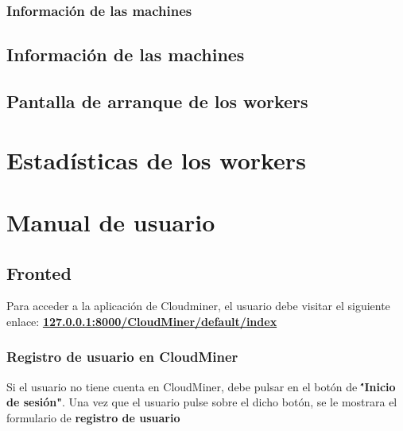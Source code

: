     \subsubsection{Informaci\'on de las machines}
    \subsection{Informaci\'on de las machines}
    \fboxsep 0.05cm
    
            \subsection{Pantalla de arranque de los workers}
            \fboxsep 0.05cm

    \section{Estad\'isticas de los workers}
    \fboxsep 0.05cm

\section{Manual de usuario}
    \subsection{Fronted}
    Para acceder a la aplicaci\'on de Cloudminer, el usuario debe visitar el siguiente enlace:
    \textbf{ \href{127.0.0.1:8000/CloudMiner/default/index}{127.0.0.1:8000/CloudMiner/default/index}}
    
     \fboxsep 0.05cm
        
        \subsubsection{Registro de usuario en CloudMiner}
        Si el usuario no tiene cuenta en CloudMiner, debe pulsar en el bot\'on de \textbf{\''Inicio de sesi\'on"}. Una vez que el usuario pulse sobre el dicho bot\'on, se le mostrara el formulario de  
        \textbf{registro de usuario}
        
        \fboxsep 0.05cm
        
        \fboxsep 0.05cm
        
  
  

    

